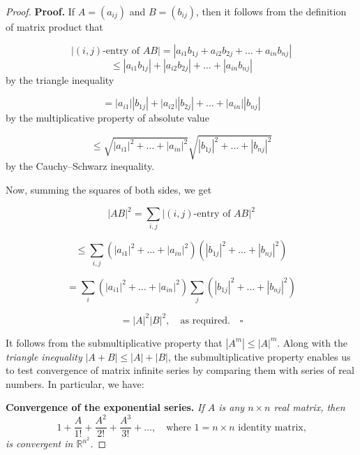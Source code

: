 \documentclass[11pt,a4paper]{article}
\theoremstyle{definition}
\numberwithin{equation}{section}
\begin{document}
\begin{proof}
\textbf{Proof.} If \( A = (a_{ij}) \) and \( B = (b_{ij}) \), then it follows from the definition of matrix product that

\begin{equation*}
|(i,j)\text{-entry of } AB| = |a_{i1} b_{1j} + a_{i2} b_{2j} + \dots + a_{in} b_{nj}|
\end{equation*}
\begin{equation*}
\leq |a_{i1} b_{1j}| + |a_{i2} b_{2j}| + \dots + |a_{in} b_{nj}|
\end{equation*}
by the triangle inequality

\begin{equation*}
= |a_{i1}||b_{1j}| + |a_{i2}||b_{2j}| + \dots + |a_{in}||b_{nj}|
\end{equation*}
by the multiplicative property of absolute value

\begin{equation*}
\leq \sqrt{|a_{i1}|^2 + \dots + |a_{in}|^2} \sqrt{|b_{1j}|^2 + \dots + |b_{nj}|^2}
\end{equation*}
by the Cauchy–Schwarz inequality.

Now, summing the squares of both sides, we get

\begin{equation*}
|AB|^2 = \sum_{i,j} |(i,j)\text{-entry of } AB|^2
\end{equation*}

\begin{equation*}
\leq \sum_{i,j} (|a_{i1}|^2 + \dots + |a_{in}|^2)(|b_{1j}|^2 + \dots + |b_{nj}|^2)
\end{equation*}

\begin{equation*}
= \sum_{i} (|a_{i1}|^2 + \dots + |a_{in}|^2) \sum_{j} (|b_{1j}|^2 + \dots + |b_{nj}|^2)
\end{equation*}

\begin{equation*}
= |A|^2 |B|^2, \quad \text{as required.} \quad \square
\end{equation*}

It follows from the submultiplicative property that \( |A^m| \leq |A|^m \). Along with the \textit{triangle inequality} \( |A + B| \leq |A| + |B| \), the submultiplicative property enables us to test convergence of matrix infinite series by comparing them with series of real numbers. In particular, we have:

\textbf{Convergence of the exponential series.} \textit{If \( A \) is any \( n \times n \) real matrix, then}
\begin{equation*}
1 + \frac{A}{1!} + \frac{A^2}{2!} + \frac{A^3}{3!} + \dots, \quad \text{where } 1 = n \times n \text{ identity matrix,}
\end{equation*}
\textit{is convergent in \( \mathbb{R}^{n^2} \).}


\end{proof}
\end{document}
